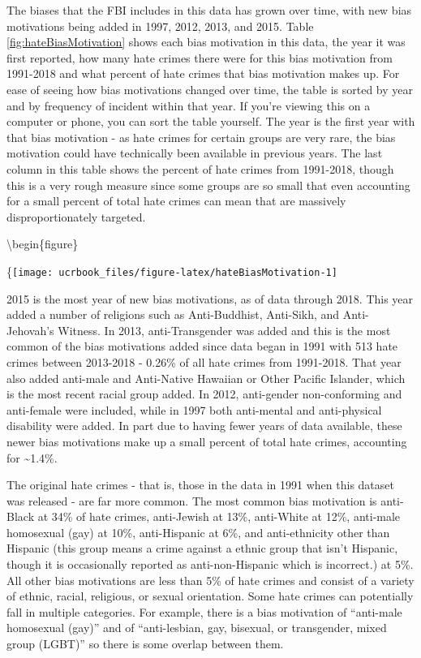 \documentclass[
  12pt,
  openany]{book}
\begin{document}
The biases that the FBI includes in this data has grown over time, with new bias motivations being added in 1997, 2012, 2013, and 2015. Table \ref{fig:hateBiasMotivation} shows each bias motivation in this data, the year it was first reported, how many hate crimes there were for this bias motivation from 1991-2018 and what percent of hate crimes that bias motivation makes up. For ease of seeing how bias motivations changed over time, the table is sorted by year and by frequency of incident within that year. If you're viewing this on a computer or phone, you can sort the table yourself. The year is the first year with that bias motivation - as hate crimes for certain groups are very rare, the bias motivation could have technically been available in previous years. The last column in this table shows the percent of hate crimes from 1991-2018, though this is a very rough measure since some groups are so small that even accounting for a small percent of total hate crimes can mean that are massively disproportionately targeted.

\textbackslash begin\{figure\}

\{\centering \texttt{[image: ucrbook\_files/figure-latex/hateBiasMotivation-1]}

2015 is the most year of new bias motivations, as of data through 2018. This year added a number of religions such as Anti-Buddhist, Anti-Sikh, and Anti-Jehovah's Witness. In 2013, anti-Transgender was added and this is the most common of the bias motivations added since data began in 1991 with 513 hate crimes between 2013-2018 - 0.26\% of all hate crimes from 1991-2018. That year also added anti-male and Anti-Native Hawaiian or Other Pacific Islander, which is the most recent racial group added. In 2012, anti-gender non-conforming and anti-female were included, while in 1997 both anti-mental and anti-physical disability were added. In part due to having fewer years of data available, these newer bias motivations make up a small percent of total hate crimes, accounting for \textasciitilde1.4\%.

The original hate crimes - that is, those in the data in 1991 when this dataset was released - are far more common. The most common bias motivation is anti-Black at 34\% of hate crimes, anti-Jewish at 13\%, anti-White at 12\%, anti-male homosexual (gay) at 10\%, anti-Hispanic at 6\%, and anti-ethnicity other than Hispanic (this group means a crime against a ethnic group that isn't Hispanic, though it is occasionally reported as anti-non-Hispanic which is incorrect.) at 5\%. All other bias motivations are less than 5\% of hate crimes and consist of a variety of ethnic, racial, religious, or sexual orientation. Some hate crimes can potentially fall in multiple categories. For example, there is a bias motivation of ``anti-male homosexual (gay)'' and of ``anti-lesbian, gay, bisexual, or transgender, mixed group (LGBT)'' so there is some overlap between them.
\end{document}

